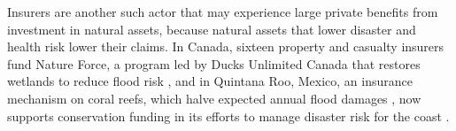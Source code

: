 \documentclass[12pt]{article}
\begin{document}
Insurers are another such actor that may experience large private benefits from investment in natural assets, because natural assets that lower disaster and health risk lower their claims. In Canada, sixteen property and casualty insurers fund Nature Force, a program led by Ducks Unlimited Canada that restores wetlands to reduce flood risk \citep{kouskyNatureInsuranceInsurance2025}, and in Quintana Roo, Mexico, an insurance mechanism on coral reefs, which halve expected annual flood damages \citep{beckGlobalFloodProtection2018}, now supports conservation funding in its efforts to manage disaster risk for the coast \citep{schelskeInsuringNaturalEcosystems2021}. 



\end{document}
